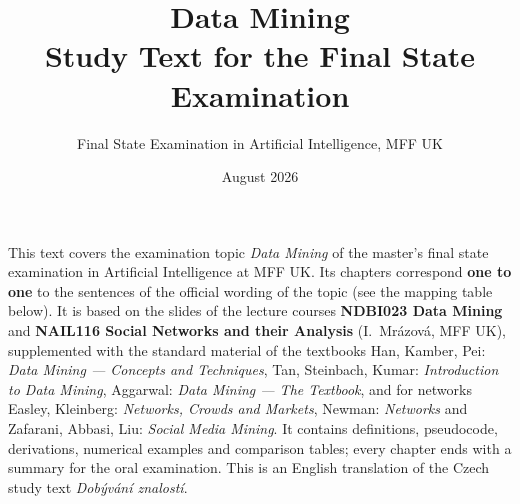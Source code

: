 \documentclass[11pt,a4paper]{article}
\title{\textbf{Data Mining}\\[2mm]
\large Study Text for the Final State Examination}
\author{Final State Examination in Artificial Intelligence, MFF UK}
\date{August 2026}
\theoremstyle{definition}
\begin{document}
\maketitle

\begin{center}
\begin{minipage}{0.92\textwidth}
\small
This text covers the examination topic \emph{Data Mining} of the master's final state
examination in Artificial Intelligence at MFF UK. Its chapters correspond \textbf{one to one}
to the sentences of the official wording of the topic (see the mapping table below). It is
based on the slides of the lecture courses \textbf{NDBI023 Data Mining} and
\textbf{NAIL116 Social Networks and their Analysis} (I.~Mrázová, MFF UK), supplemented with the
standard material of the textbooks Han, Kamber, Pei: \emph{Data Mining --- Concepts and
Techniques}, Tan, Steinbach, Kumar: \emph{Introduction to Data Mining}, Aggarwal: \emph{Data
Mining --- The Textbook}, and for networks Easley, Kleinberg: \emph{Networks, Crowds and
Markets}, Newman: \emph{Networks} and Zafarani, Abbasi, Liu: \emph{Social Media Mining}. It
contains definitions, pseudocode, derivations, numerical examples and comparison tables; every
chapter ends with a summary for the oral examination. This is an English translation of the
Czech study text \emph{Dobývání znalostí}.
\end{minipage}
\end{center}
\end{document}

